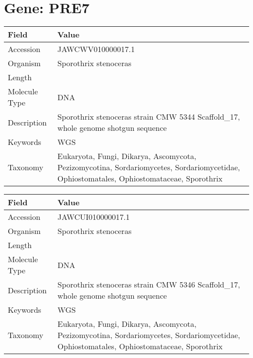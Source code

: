 \documentclass[10pt]{article}
\begin{document}
\vspace{1em}
\section{Gene: PRE7}
{\footnotesize
\begin{longtable}{>{\raggedright\arraybackslash}p{4.5cm} >{\raggedright\arraybackslash}p{11.5cm}}
\textbf{Field} & \textbf{Value} \\
\hline
Accession & JAWCWV010000017.1 \\
Organism & Sporothrix stenoceras \\
Length & 653204 \\
Molecule Type & DNA \\
Description & Sporothrix stenoceras strain CMW 5344 Scaffold\_17, whole genome shotgun sequence \\
Keywords & WGS \\
Taxonomy & Eukaryota, Fungi, Dikarya, Ascomycota, Pezizomycotina, Sordariomycetes, Sordariomycetidae, Ophiostomatales, Ophiostomataceae, Sporothrix \\
\end{longtable}
}

\vspace{1em}
{\footnotesize
\begin{longtable}{>{\raggedright\arraybackslash}p{4.5cm} >{\raggedright\arraybackslash}p{11.5cm}}
\textbf{Field} & \textbf{Value} \\
\hline
Accession & JAWCUI010000017.1 \\
Organism & Sporothrix stenoceras \\
Length & 649007 \\
Molecule Type & DNA \\
Description & Sporothrix stenoceras strain CMW 5346 Scaffold\_17, whole genome shotgun sequence \\
Keywords & WGS \\
Taxonomy & Eukaryota, Fungi, Dikarya, Ascomycota, Pezizomycotina, Sordariomycetes, Sordariomycetidae, Ophiostomatales, Ophiostomataceae, Sporothrix \\
\end{longtable}
}

\vspace{1em}
\end{document}
